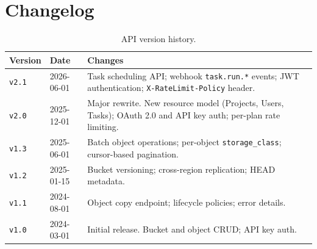 \documentclass[
    language=english,
    doctype=article,
    institution=none,
]{../../omnilatex}
\begin{document}
\section{Changelog}
\label{sec:changelog}
\begin{table}[htbp]
    \centering
    \caption{API version history.}
    \label{tab:changelog}
    \begin{tabularx}{\textwidth}{@{}llX@{}}
        \toprule
        \textbf{Version} & \textbf{Date} & \textbf{Changes} \\
        \midrule
        \texttt{v2.1} & 2026-06-01 &
            Task scheduling API; webhook \texttt{task.run.*} events;
            JWT authentication; \texttt{X-RateLimit-Policy} header. \\
        \texttt{v2.0} & 2025-12-01 &
            Major rewrite.  New resource model (Projects, Users, Tasks);
            OAuth 2.0 and API key auth; per-plan rate limiting. \\
        \texttt{v1.3} & 2025-06-01 &
            Batch object operations; per-object \texttt{storage\_class};
            cursor-based pagination. \\
        \texttt{v1.2} & 2025-01-15 &
            Bucket versioning; cross-region replication; HEAD metadata. \\
        \texttt{v1.1} & 2024-08-01 &
            Object copy endpoint; lifecycle policies; error details. \\
        \texttt{v1.0} & 2024-03-01 &
            Initial release.  Bucket and object CRUD; API key auth. \\
        \bottomrule
    \end{tabularx}
\end{table}

\printbibliography[heading=none]
\end{document}
